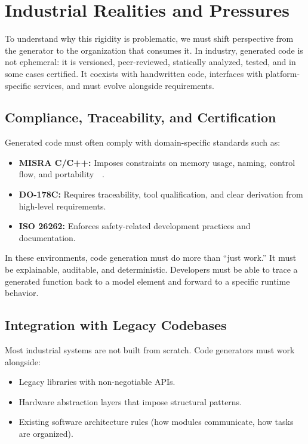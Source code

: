 \section{Industrial Realities and Pressures}
\label{sec:industrial_realities}

To understand why this rigidity is problematic, we must shift perspective from the generator to the organization that consumes it. In industry, generated code is not ephemeral: it is versioned, peer-reviewed, statically analyzed, tested, and in some cases certified. It coexists with handwritten code, interfaces with platform-specific services, and must evolve alongside requirements.

\subsection*{Compliance, Traceability, and Certification}

Generated code must often comply with domain-specific standards such as:

\begin{itemize}
	\item \textbf{\gls{MISRA} C/C++:} Imposes constraints on memory usage, naming, control flow, and portability~\cite{Misra_C_2025}~\cite{Misra_Cpp_2023}.
	\item \textbf{DO-178C:} Requires traceability, tool qualification, and clear derivation from high-level requirements. 
	\item \textbf{ISO 26262:} Enforces safety-related development practices and documentation.
\end{itemize}

In these environments, code generation must do more than “just work.” It must be explainable, auditable, and deterministic. Developers must be able to trace a generated function back to a model element and forward to a specific runtime behavior.

\subsection*{Integration with Legacy Codebases}

Most industrial systems are not built from scratch. Code generators must work alongside:

\begin{itemize}
	\item Legacy libraries with non-negotiable \gls{API}s.
	\item Hardware abstraction layers that impose structural patterns.
	\item Existing software architecture rules (how modules communicate, how tasks are organized).
\end{itemize}

